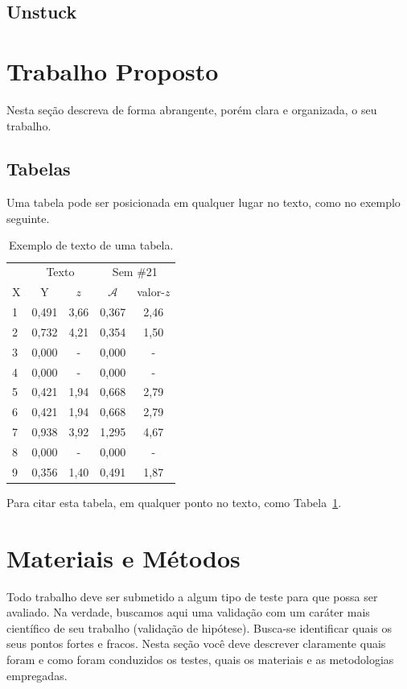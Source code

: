 \documentclass[twoside,conference,a4paper]{IEEEtran}
\begin{document}
\subsection{Unstuck}

\section{Trabalho Proposto}

Nesta seção descreva de forma abrangente, porém clara e organizada, o seu trabalho.

\subsection{Tabelas}

Uma tabela pode ser posicionada em qualquer lugar no texto, como no exemplo
seguinte.
%
\begin{table}[ht]
\renewcommand{\arraystretch}{1.3}
\centering
 \caption{Exemplo de texto de uma tabela.}
 \label{tab:tab1}
 \begin{tabular}{lcccc}\hline
  & \multicolumn{2}{c}{Texto}
  & \multicolumn{2}{c}{Sem \#21} \\ \cline{2-5}
  X & Y & $z$ & $\mathcal{A}$ & valor-$z$ \\ \hline \hline
  1      &0,491  & 3,66   &0,367 &2,46  \\
  2    &0,732  & 4,21   &0,354 &1,50  \\
  3      &0,000  & -      &0,000 & -    \\
  4      &0,000  & -      &0,000 & -  \\
  5      &0,421  & 1,94   &0,668 &2,79  \\
  6      &0,421  & 1,94   &0,668 &2,79  \\
  7      &0,938  & 3,92   &1,295 &4,67 \\
  8       &0,000  & -      &0,000 & - \\
  9       &0,356  & 1,40   &0,491 &1,87 \\ \hline
 \end{tabular}
\end{table}

Para citar esta tabela, em qualquer ponto no texto, como Tabela~\ref{tab:tab1}.


\section{Materiais e Métodos}

Todo trabalho deve ser submetido a algum tipo de teste para que possa ser avaliado. Na verdade, buscamos aqui uma validação com um caráter mais científico de seu trabalho (validação de hipótese). Busca-se identificar quais os seus pontos fortes e fracos. Nesta seção você deve descrever claramente quais foram e como foram conduzidos os testes, quais os materiais e as metodologias empregadas.   
\end{document}
